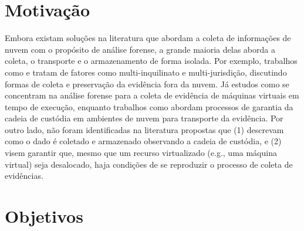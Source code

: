 \section{Motivação}
\label{sec:intro-motiv}


%
Embora existam soluções na literatura que abordam a coleta de informações de nuvem com o propósito de análise forense, a grande maioria delas aborda a coleta, o transporte e o armazenamento de forma isolada.
%
Por exemplo, trabalhos como \cite{DykstraFROST:2013} e \cite{ReichertAutoAcquisition:2015} tratam de fatores como multi-inquilinato e multi-jurisdição, discutindo formas de coleta e preservação da evidência fora da nuvem.
%
Já estudos como \cite{GeorgeDF2CE:2012} se concentram na análise forense para a coleta de evidência de máquinas virtuais em tempo de execução, enquanto trabalhos como \cite{SangLogApproach:2013} abordam processos de garantia da cadeia de custódia em ambientes de nuvem para transporte da evidência.
%
%
%
Por outro lado, não foram identificadas na literatura propostas que (1) descrevam como o dado é coletado e armazenado observando a cadeia de custódia, e (2) visem garantir que, mesmo que um recurso virtualizado (e.g., uma máquina virtual) seja desalocado, haja condições de se reproduzir o processo de coleta de evidências.

\section{Objetivos}
\label{sec:intro-objetivos}

